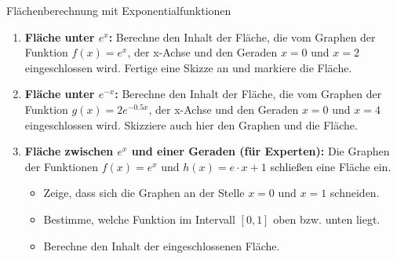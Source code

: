 \begin{aufgabenumgebung}{Flächenberechnung mit Exponentialfunktionen}
\begin{enumerate}
    \item \textbf{Fläche unter $e^x$:}
        Berechne den Inhalt der Fläche, die vom Graphen der Funktion $f(x) = e^x$, der x-Achse und den Geraden $x=0$ und $x=2$ eingeschlossen wird. Fertige eine Skizze an und markiere die Fläche.
    \item \textbf{Fläche unter $e^{-x}$:}
        Berechne den Inhalt der Fläche, die vom Graphen der Funktion $g(x) = 2e^{-0.5x}$, der x-Achse und den Geraden $x=0$ und $x=4$ eingeschlossen wird. Skizziere auch hier den Graphen und die Fläche.
    \item \textbf{Fläche zwischen $e^x$ und einer Geraden (für Experten):}
        Die Graphen der Funktionen $f(x) = e^x$ und $h(x) = e\cdot x + 1$ schließen eine Fläche ein.
        \begin{itemize}
            \item Zeige, dass sich die Graphen an der Stelle $x=0$ und $x=1$ schneiden.
            \item Bestimme, welche Funktion im Intervall $[0,1]$ oben bzw. unten liegt.
            \item Berechne den Inhalt der eingeschlossenen Fläche.
        \end{itemize}
\end{enumerate}
\end{aufgabenumgebung}


